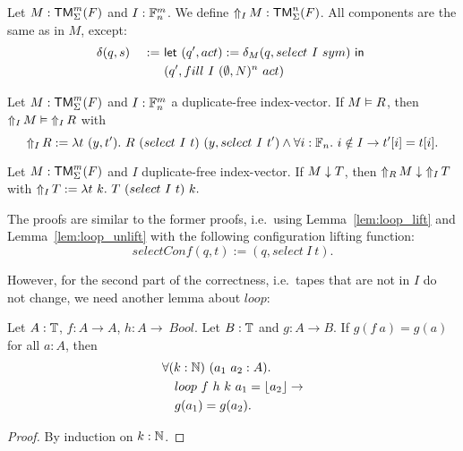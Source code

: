 \begin{definition}[$\LiftTapes{M}{I}$][LiftTapes]
  \label{def:LiftTapes}
  Let $M:\TM_\Sigma^m(F)$ and $I : \Fin_n^m$.  We define $\LiftTapes{M}{I} : \TM_\Sigma^n(F)$.  All components are the same as in $M$, except:
  \begin{alignat*}{2}
    &\delta(q,s) &~:=~& \Let{(q', act) := \delta_M(q, select~I~sym)}{\\%
    &            &~  ~& (q', fill~I~(\None,N)^n~act)}
  \end{alignat*}
\end{definition}

\begin{lemma}
  \label{lem:LiftTapes_Realise}
  Let $M : \TM_\Sigma^m(F)$ and $I : \Fin_n^m$ a duplicate-free index-vector.  If $M \Realise R$, then $\LiftTapes{M}{I} \Realise \LiftTapes{R}{I}$ with
  \[
    \LiftTapes{R}{I} := \lambda t~(y,t').~ R~(select~I~t)~(y, select~I~t') \land \forall i:\Fin_n.~i \notin I \rightarrow t'[i]=t[i].
  \]
\end{lemma}

\begin{lemma}
  \label{lem:LiftTapes_TerminatesIn}
  Let $M : \TM_\Sigma^m(F)$ and $I$ duplicate-free index-vector. If $M \TerminatesIn T$, then $\LiftTapes{M}{R} \TerminatesIn \LiftTapes{T}{I}$ with
  $
    \LiftTapes{T}{I} := \lambda t~k.~ T~(select~I~t)~k.
  $
\end{lemma}

The proofs are similar to the former proofs, i.e.\ using Lemma~\ref{lem:loop_lift} and Lemma~\ref{lem:loop_unlift} with the following configuration
lifting function:
\[
  selectConf(q,t) := (q, select~I~t).
\]

However, for the second part of the correctness, i.e.\ tapes that are not in $I$ do not change, we need another lemma about $loop$:

\begin{lemma}
  \label{lem:loop_map}
  Let $A:\Type$, $f:A \to A$, $h:A \to\ Bool$.  Let $B:\Type$ and $g : A \to B$.  If $g(f~a)=g(a)$ for all $a:A$, then
  \begin{alignat*}{1}
    & \forall (k:\Nat)~(a_1~a_2 : A). \\
    & \quad loop~f~h~k~a_1 = \Some{a_2} \rightarrow \\
    & \quad g(a_1) = g(a_2).
  \end{alignat*}
\end{lemma}
\begin{proof}
  By induction on $k:\Nat$.
\end{proof}

